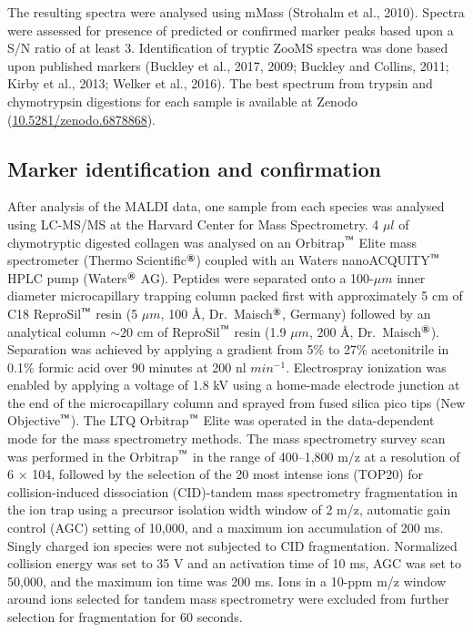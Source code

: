\documentclass[preprint, 3p, authoryear]{elsarticle} %
\begin{document}
The resulting spectra were analysed using mMass (Strohalm et al., 2010). Spectra were assessed for presence of predicted or confirmed marker peaks based upon a S/N ratio of at least 3. Identification of tryptic ZooMS spectra was done based upon published markers (Buckley et al., 2017, 2009; Buckley and Collins, 2011; Kirby et al., 2013; Welker et al., 2016). The best spectrum from trypsin and chymotrypsin digestions for each sample is available at Zenodo (\href{https://doi.org/doi:10.5281/zenodo.6878868}{10.5281/zenodo.6878868}).

\hypertarget{marker-identification-and-confirmation}{%
\subsection{Marker identification and confirmation}\label{marker-identification-and-confirmation}}

After analysis of the MALDI data, one sample from each species was analysed using LC-MS/MS at the Harvard Center for Mass Spectrometry. 4 \(\mu l\) of chymotryptic digested collagen was analysed on an Orbitrap\(^\text{\texttrademark}\) Elite mass spectrometer (Thermo Scientific\(^\text{\textregistered}\)) coupled with an Waters nanoACQUITY\(^\text{\texttrademark}\) HPLC pump (Waters\(^\text{\textregistered}\) AG). Peptides were separated onto a 100-\(\mu m\) inner diameter microcapillary trapping column packed first with approximately 5 cm of C18 ReproSil\(^\text{\texttrademark}\) resin (5 \(\mu m\), 100 Å, Dr.~Maisch\(^\text{\textregistered}\), Germany) followed by an analytical column \(\sim 20\) cm of ReproSil\(^\text{\texttrademark}\) resin (1.9 \(\mu m\), 200 Å, Dr.~Maisch\(^\text{\textregistered}\)). Separation was achieved by applying a gradient from 5\% to 27\% acetonitrile in 0.1\% formic acid over 90 minutes at 200 nl \(min ^{-1}\). Electrospray ionization was enabled by applying a voltage of 1.8 kV using a home-made electrode junction at the end of the microcapillary column and sprayed from fused silica pico tips (New Objective\(^\text{\texttrademark}\)). The LTQ Orbitrap\(^\text{\texttrademark}\) Elite was operated in the data-dependent mode for the mass spectrometry methods. The mass spectrometry survey scan was performed in the Orbitrap\(^\text{\texttrademark}\) in the range of 400--1,800 m/z at a resolution of 6 × 104, followed by the selection of the 20 most intense ions (TOP20) for collision-induced dissociation (CID)-tandem mass spectrometry fragmentation in the ion trap using a precursor isolation width window of 2 m/z, automatic gain control (AGC) setting of 10,000, and a maximum ion accumulation of 200 ms. Singly charged ion species were not subjected to CID fragmentation. Normalized collision energy was set to 35 V and an activation time of 10 ms, AGC was set to 50,000, and the maximum ion time was 200 ms. Ions in a 10-ppm m/z window around ions selected for tandem mass spectrometry were excluded from further selection for fragmentation for 60 seconds.
\end{document}
